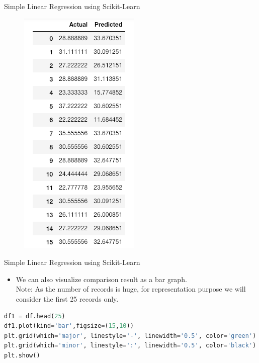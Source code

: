\documentclass[12pt,xcolor={dvipsnames}]{beamer}
\begin{document}
\begin{frame}{Simple Linear Regression using Scikit-Learn}
\begin{figure}
\centering
\includegraphics[scale=0.7]{LR_Reg6.png}
\end{figure}
\end{frame}

\begin{frame}[fragile]{Simple Linear Regression using Scikit-Learn}
\begin{itemize}
\item We can also visualize comparison result as a bar graph.\\ Note: As the number of records is huge, for representation purpose we will consider the first 25 records only.
\end{itemize}
\begin{lstlisting}[language=Python]
df1 = df.head(25)
df1.plot(kind='bar',figsize=(15,10))
plt.grid(which='major', linestyle='-', linewidth='0.5', color='green')
plt.grid(which='minor', linestyle=':', linewidth='0.5', color='black')
plt.show()
\end{lstlisting}
\end{frame}
\end{document}
